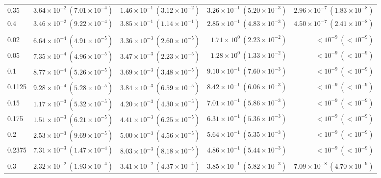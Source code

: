 \begin{table}[htbp]
\begin{tabular}{@{} l rrrr @{}}
0.35 & $3.64\!\times\!10^{-2}\ (7.01\!\times\!10^{-4})$ & $1.46\!\times\!10^{-1}\ (3.12\!\times\!10^{-2})$ & $3.26\!\times\!10^{-1}\ (5.20\!\times\!10^{-3})$ & $2.96\!\times\!10^{-7}\ (1.83\!\times\!10^{-8})$ \\
0.4 & $3.46\!\times\!10^{-2}\ (9.22\!\times\!10^{-4})$ & $3.85\!\times\!10^{-1}\ (1.14\!\times\!10^{-1})$ & $2.85\!\times\!10^{-1}\ (4.83\!\times\!10^{-3})$ & $4.50\!\times\!10^{-7}\ (2.41\!\times\!10^{-8})$ \\
\addlinespace
\multicolumn{5}{@{}l}{\textit{Wide ($p \sim \mathcal{U}(0.05, 0.3)$)}} \\
0.02 & $6.64\!\times\!10^{-4}\ (4.91\!\times\!10^{-5})$ & $3.36\!\times\!10^{-3}\ (2.60\!\times\!10^{-5})$ & $1.71\!\times\!10^{0}\ (2.23\!\times\!10^{-2})$ & $<\!10^{-9}\ (<\!10^{-9})$ \\
0.05 & $7.35\!\times\!10^{-4}\ (4.96\!\times\!10^{-5})$ & $3.47\!\times\!10^{-3}\ (2.23\!\times\!10^{-5})$ & $1.28\!\times\!10^{0}\ (1.33\!\times\!10^{-2})$ & $<\!10^{-9}\ (<\!10^{-9})$ \\
0.1 & $8.77\!\times\!10^{-4}\ (5.26\!\times\!10^{-5})$ & $3.69\!\times\!10^{-3}\ (3.48\!\times\!10^{-5})$ & $9.10\!\times\!10^{-1}\ (7.60\!\times\!10^{-3})$ & $<\!10^{-9}\ (<\!10^{-9})$ \\
0.1125 & $9.28\!\times\!10^{-4}\ (5.28\!\times\!10^{-5})$ & $3.84\!\times\!10^{-3}\ (6.59\!\times\!10^{-5})$ & $8.42\!\times\!10^{-1}\ (6.06\!\times\!10^{-3})$ & $<\!10^{-9}\ (<\!10^{-9})$ \\
0.15 & $1.17\!\times\!10^{-3}\ (5.32\!\times\!10^{-5})$ & $4.20\!\times\!10^{-3}\ (4.30\!\times\!10^{-5})$ & $7.01\!\times\!10^{-1}\ (5.86\!\times\!10^{-3})$ & $<\!10^{-9}\ (<\!10^{-9})$ \\
0.175 & $1.51\!\times\!10^{-3}\ (6.21\!\times\!10^{-5})$ & $4.41\!\times\!10^{-3}\ (6.25\!\times\!10^{-5})$ & $6.31\!\times\!10^{-1}\ (5.36\!\times\!10^{-3})$ & $<\!10^{-9}\ (<\!10^{-9})$ \\
0.2 & $2.53\!\times\!10^{-3}\ (9.69\!\times\!10^{-5})$ & $5.00\!\times\!10^{-3}\ (4.56\!\times\!10^{-5})$ & $5.64\!\times\!10^{-1}\ (5.35\!\times\!10^{-3})$ & $<\!10^{-9}\ (<\!10^{-9})$ \\
0.2375 & $7.31\!\times\!10^{-3}\ (1.47\!\times\!10^{-4})$ & $8.03\!\times\!10^{-3}\ (8.18\!\times\!10^{-5})$ & $4.86\!\times\!10^{-1}\ (5.44\!\times\!10^{-3})$ & $<\!10^{-9}\ (<\!10^{-9})$ \\
0.3 & $2.32\!\times\!10^{-2}\ (1.93\!\times\!10^{-4})$ & $3.41\!\times\!10^{-2}\ (4.37\!\times\!10^{-4})$ & $3.85\!\times\!10^{-1}\ (5.82\!\times\!10^{-3})$ & $7.09\!\times\!10^{-8}\ (4.70\!\times\!10^{-9})$ \\

\end{tabular}
\end{table}
